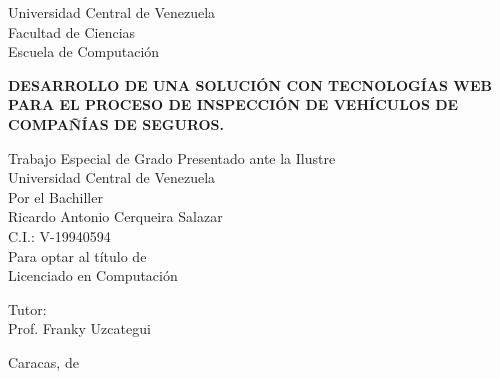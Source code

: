 \begin{center}
	Universidad Central de Venezuela\\
	Facultad de Ciencias\\
	Escuela de Computación\\
	
\end{center}

\vspace{2.5cm}
\begin{center}
	\large{\textbf{ DESARROLLO DE UNA SOLUCIÓN CON TECNOLOGÍAS WEB PARA EL PROCESO DE INSPECCIÓN DE VEHÍCULOS DE COMPAÑÍAS DE SEGUROS.}}
\end{center}

\vspace{5.0cm}
\begin{center}
	Trabajo Especial de Grado Presentado ante la Ilustre\\
	Universidad Central de Venezuela\\
	Por el Bachiller\\
	Ricardo Antonio Cerqueira Salazar\\
	C.I.: V-19940594\\
	Para optar al título de \\
    Licenciado en Computación \\
\end{center}

\begin{center}
	Tutor:\\ Prof. Franky Uzcategui\\
\end{center}

\vspace{1.0cm}
\begin{center}
	Caracas, \monthname[\month] de \the\year
\end{center}